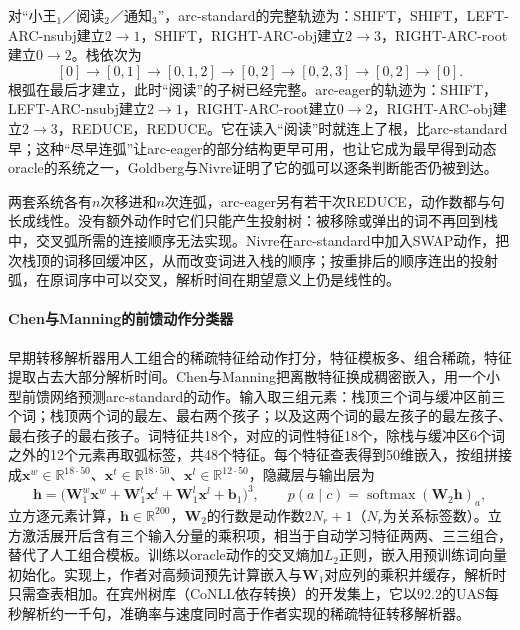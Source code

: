 对“小王$_1$／阅读$_2$／通知$_3$”，arc-standard的完整轨迹为：SHIFT，SHIFT，LEFT-ARC-nsubj建立$2\to1$，SHIFT，RIGHT-ARC-obj建立$2\to3$，RIGHT-ARC-root建立$0\to2$。栈依次为
\[
 [0]\to[0,1]\to[0,1,2]\to[0,2]
 \to[0,2,3]\to[0,2]\to[0].
\]
根弧在最后才建立，此时“阅读”的子树已经完整。arc-eager的轨迹为：SHIFT，LEFT-ARC-nsubj建立$2\to1$，RIGHT-ARC-root建立$0\to2$，RIGHT-ARC-obj建立$2\to3$，REDUCE，REDUCE。它在读入“阅读”时就连上了根，比arc-standard早；这种“尽早连弧”让arc-eager的部分结构更早可用，也让它成为最早得到动态oracle的系统之一，Goldberg与Nivre证明了它的弧可以逐条判断能否仍被到达。

两套系统各有$n$次移进和$n$次连弧，arc-eager另有若干次REDUCE，动作数都与句长成线性。没有额外动作时它们只能产生投射树：被移除或弹出的词不再回到栈中，交叉弧所需的连接顺序无法实现。Nivre在arc-standard中加入SWAP动作，把次栈顶的词移回缓冲区，从而改变词进入栈的顺序；按重排后的顺序连出的投射弧，在原词序中可以交叉，解析时间在期望意义上仍是线性的。

\paragraph{Chen与Manning的前馈动作分类器}
早期转移解析器用人工组合的稀疏特征给动作打分，特征模板多、组合稀疏，特征提取占去大部分解析时间。Chen与Manning把离散特征换成稠密嵌入，用一个小型前馈网络预测arc-standard的动作。输入取三组元素：栈顶三个词与缓冲区前三个词；栈顶两个词的最左、最右两个孩子；以及这两个词的最左孩子的最左孩子、最右孩子的最右孩子。词特征共18个，对应的词性特征18个，除栈与缓冲区6个词之外的12个元素再取弧标签，共48个特征。每个特征查表得到50维嵌入，按组拼接成$\bm x^{w}\in\mathbb R^{18\cdot50}$、$\bm x^{t}\in\mathbb R^{18\cdot50}$、$\bm x^{l}\in\mathbb R^{12\cdot50}$，隐藏层与输出层为
\begin{equation}
 \bm h=\bigl(\bm W_1^{w}\bm x^{w}+\bm W_1^{t}\bm x^{t}+\bm W_1^{l}\bm x^{l}+\bm b_1\bigr)^{3},\qquad
 p(a\mid c)=\operatorname{softmax}(\bm W_2\bm h)_a,
 \label{eq:nlp-analysis-chen-manning}
\end{equation}
立方逐元素计算，$\bm h\in\mathbb R^{200}$，$\bm W_2$的行数是动作数$2N_r+1$（$N_r$为关系标签数）。立方激活展开后含有三个输入分量的乘积项，相当于自动学习特征两两、三三组合，替代了人工组合模板。训练以oracle动作的交叉熵加$L_2$正则，嵌入用预训练词向量初始化。实现上，作者对高频词预先计算嵌入与$\bm W_1$对应列的乘积并缓存，解析时只需查表相加。在宾州树库（CoNLL依存转换）的开发集上，它以92.2的UAS每秒解析约一千句，准确率与速度同时高于作者实现的稀疏特征转移解析器。

